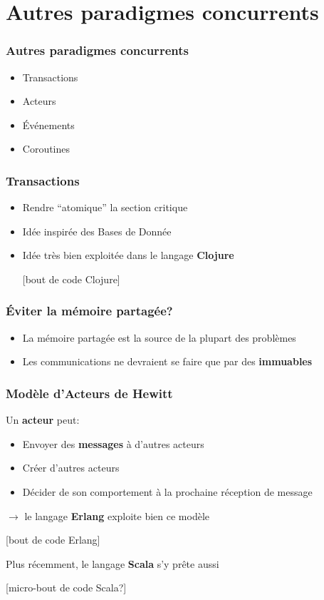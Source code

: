 \documentclass{beamer}
\begin{document}
\section{Autres paradigmes concurrents}
\begin{frame}
  \frametitle{Autres paradigmes concurrents}
  \begin{itemize}
  \item Transactions
  \item Acteurs
  \item Événements
  \item Coroutines
  \end{itemize}
\end{frame}
\begin{frame}
  \frametitle{Transactions}
  \begin{itemize}
  \item Rendre ``atomique'' la section critique
  \item Idée inspirée des Bases de Donnée
  \item Idée très bien exploitée dans le langage \textbf{Clojure}
    \begin{center}
      [bout de code Clojure]
    \end{center}
  \end{itemize}
\end{frame}
\begin{frame}
  \frametitle{Éviter la mémoire partagée?}
  \begin{itemize}
  \item La mémoire partagée est la source de la plupart des problèmes
  \item Les communications ne devraient se faire que par des \textbf{immuables}
  \end{itemize}
\end{frame}
\begin{frame}
  \frametitle{Modèle d'Acteurs de Hewitt}
  Un \textbf{acteur} peut:
  \begin{itemize}
  \item Envoyer des \textbf{messages} à d'autres acteurs
  \item Créer d'autres acteurs
  \item Décider de son comportement à la prochaine réception de message
  \end{itemize}
  $\rightarrow$ le langage \textbf{Erlang} exploite bien ce modèle
  \begin{center}
    [bout de code Erlang]
  \end{center}
  Plus récemment, le langage \textbf{Scala} s'y prête aussi
  \begin{center}
    [micro-bout de code Scala?]
  \end{center}
\end{frame}
\end{document}
